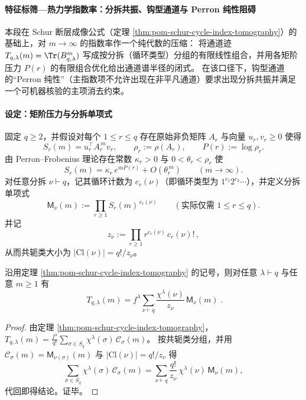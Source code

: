 
\paragraph{特征标筛—热力学指数率：分拆共振、钩型通道与 Perron 纯性阻碍}\label{subsubsec:pom-schur-character-sieve-thermodynamic}
本段在 Schur 断层成像公式（定理 \ref{thm:pom-schur-cycle-index-tomography}）的基础上，对 \(m\to\infty\) 的指数率作一个纯代数的压缩：
将通道迹 \(T_{q,\lambda}(m)=\Tr(B_{q,\lambda}^m)\) 写成按分拆（循环类型）分组的有限线性组合，并用各矩阶压力 \(P(r)\) 的有限组合优化给出通道谱半径的闭式。
在该口径下，钩型通道的“Perron 纯性”（主指数项不允许出现在非平凡通道）要求出现分拆共振并满足一个可机器核验的主项消去约束。

\paragraph{设定：矩阶压力与分拆单项式}
固定 \(q\ge 2\)，并假设对每个 \(1\le r\le q\) 存在原始非负矩阵 \(A_r\) 与向量 \(u_r,v_r\ge 0\) 使得
\[
S_r(m)=u_r^{\top}A_r^{\,m}v_r,
\qquad
\rho_r:=\rho(A_r),
\qquad
P(r):=\log\rho_r.
\]
由 Perron--Frobenius 理论存在常数 \(\kappa_r>0\) 与 \(0<\theta_r<\rho_r\) 使
\begin{equation}\label{eq:pom-sr-main-term-kappa}
S_r(m)=\kappa_r\,e^{mP(r)}+O(\theta_r^{\,m})\qquad(m\to\infty).
\end{equation}
对任意分拆 \(\nu\vdash q\)，记其循环计数为 \(c_r(\nu)\)（即循环类型为 \(1^{c_1}2^{c_2}\cdots\)），并定义分拆单项式
\[
\mathsf{M}_\nu(m):=\prod_{r\ge 1} S_r(m)^{\,c_r(\nu)}\qquad(\text{实际仅需 }1\le r\le q).
\]
并记
\[
z_\nu:=\prod_{r\ge 1} r^{c_r(\nu)}\,c_r(\nu)!\,,
\]
从而共轭类大小为 \(|\mathrm{Cl}(\nu)|=q!/z_\nu\)。

\begin{proposition}\label{prop:pom-schur-tomography-by-partitions}
沿用定理 \ref{thm:pom-schur-cycle-index-tomography} 的记号，则对任意 \(\lambda\vdash q\) 与任意 \(m\ge 1\) 有
\[
\boxed{\;
T_{q,\lambda}(m)
=
f^\lambda\sum_{\nu\vdash q}\frac{\chi^\lambda(\nu)}{z_\nu}\,\mathsf{M}_\nu(m)\; }.
\]
\end{proposition}
\begin{proof}
由定理 \ref{thm:pom-schur-cycle-index-tomography}，
\(
T_{q,\lambda}(m)
=\frac{f^\lambda}{q!}\sum_{\sigma\in S_q}\chi^\lambda(\sigma)\,\mathcal{C}_\sigma(m)
\)。
按共轭类分组，并用 \(\mathcal{C}_\sigma(m)=\mathsf{M}_{\nu(\sigma)}(m)\) 与 \(|\mathrm{Cl}(\nu)|=q!/z_\nu\) 得
\[
\sum_{\sigma\in S_q}\chi^\lambda(\sigma)\,\mathcal{C}_\sigma(m)
=\sum_{\nu\vdash q}\frac{q!}{z_\nu}\,\chi^\lambda(\nu)\,\mathsf{M}_\nu(m),
\]
代回即得结论。证毕。
\end{proof}

